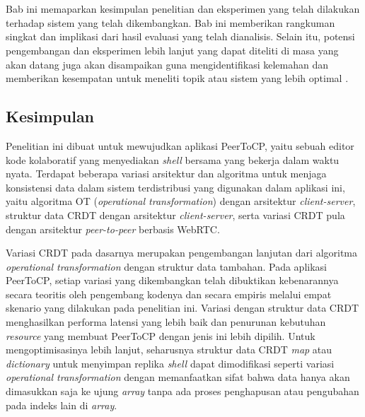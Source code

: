 \chapter{\kesimpulan}
\label{bab:6}
Bab ini memaparkan kesimpulan penelitian dan eksperimen yang telah dilakukan terhadap sistem yang telah dikembangkan. Bab ini memberikan rangkuman singkat dan implikasi dari hasil evaluasi yang telah dianalisis. Selain itu, potensi pengembangan dan eksperimen lebih lanjut yang dapat diteliti di masa yang akan datang juga akan disampaikan guna mengidentifikasi kelemahan dan memberikan kesempatan untuk meneliti topik atau sistem yang lebih optimal .

\section{Kesimpulan}
\label{sec:kesimpulan}

Penelitian ini dibuat untuk mewujudkan aplikasi PeerToCP, yaitu sebuah editor kode kolaboratif yang menyediakan \textit{shell} bersama yang bekerja dalam waktu nyata. Terdapat beberapa variasi arsitektur dan algoritma untuk menjaga konsistensi data dalam sistem terdistribusi yang digunakan dalam aplikasi ini, yaitu algoritma OT (\textit{operational transformation}) dengan arsitektur \textit{client-server}, struktur data CRDT dengan arsitektur \textit{client-server}, serta variasi CRDT pula dengan arsitektur \textit{peer-to-peer} berbasis WebRTC.

Variasi CRDT pada dasarnya merupakan pengembangan lanjutan dari algoritma \textit{operational transformation} dengan struktur data tambahan. Pada aplikasi PeerToCP, setiap variasi yang dikembangkan telah dibuktikan kebenarannya secara teoritis oleh pengembang kodenya dan secara empiris melalui empat skenario yang dilakukan pada penelitian ini. Variasi dengan struktur data CRDT menghasilkan performa latensi yang lebih baik dan penurunan kebutuhan \textit{resource} yang membuat PeerToCP dengan jenis ini lebih dipilih. Untuk mengoptimisasinya lebih lanjut, seharusnya struktur data CRDT \textit{map} atau \textit{dictionary} untuk menyimpan replika \textit{shell} dapat dimodifikasi seperti variasi \textit{operational transformation} dengan memanfaatkan sifat bahwa data hanya akan dimasukkan saja ke ujung \textit{array} tanpa ada proses penghapusan atau pengubahan pada indeks lain di \textit{array}.

